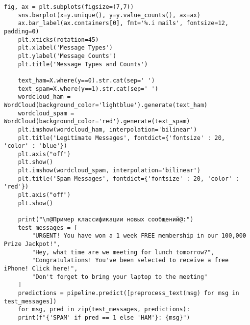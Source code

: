 \begin{lstlisting}[label=lst:1,caption=Фильтрация спама с использованием наивного байесовского классификатора]
	fig, ax = plt.subplots(figsize=(7,7))
	sns.barplot(x=y.unique(), y=y.value_counts(), ax=ax)
	ax.bar_label(ax.containers[0], fmt='%.i mails', fontsize=12, padding=0)
	plt.xticks(rotation=45)
	plt.xlabel('Message Types')
	plt.ylabel('Message Counts')
	plt.title('Message Types and Counts')
	
	text_ham=X.where(y==0).str.cat(sep=' ')
	text_spam=X.where(y==1).str.cat(sep=' ')
	wordcloud_ham = WordCloud(background_color='lightblue').generate(text_ham)
	wordcloud_spam = WordCloud(background_color='red').generate(text_spam)
	plt.imshow(wordcloud_ham, interpolation='bilinear')
	plt.title('Legitimate Messages', fontdict={'fontsize' : 20, 'color' : 'blue'})
	plt.axis("off")
	plt.show()
	plt.imshow(wordcloud_spam, interpolation='bilinear')
	plt.title('Spam Messages', fontdict={'fontsize' : 20, 'color' : 'red'})
	plt.axis("off")
	plt.show()
	
	print("\n@Пример классификации новых сообщений@:")
	test_messages = [
		"URGENT! You have won a 1 week FREE membership in our 100,000 Prize Jackpot!",
		"Hey, what time are we meeting for lunch tomorrow?",
		"Congratulations! You've been selected to receive a free iPhone! Click here!",
		"Don't forget to bring your laptop to the meeting"
	]
	predictions = pipeline.predict([preprocess_text(msg) for msg in test_messages])
	for msg, pred in zip(test_messages, predictions):
	print(f"{'SPAM' if pred == 1 else 'HAM'}: {msg}")
\end{lstlisting}

\clearpage
